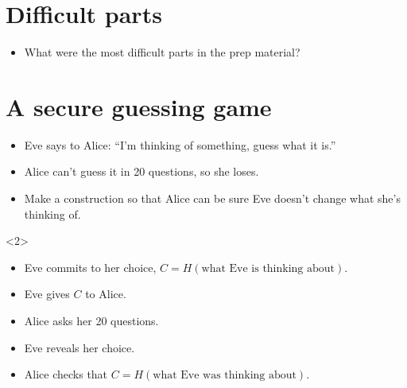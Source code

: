 \mode*

\section{Difficult parts}

\begin{frame}
  \begin{question}
    \begin{itemize}
      \item What were the most difficult parts in the prep material?
    \end{itemize}
  \end{question}
\end{frame}

\section{A secure guessing game}

\begin{frame}
  \begin{exercise}
    \begin{itemize}
      \item Eve says to Alice: \enquote{I'm thinking of something, guess what 
        it is.}
      \item Alice can't guess it in 20 questions, so she loses.
      \item Make a construction so that Alice can be sure Eve doesn't change 
        what she's thinking of.
    \end{itemize}
  \end{exercise}

  \begin{onlyenv}<2>
    \begin{solution}
      \begin{itemize}
        \item Eve commits to her choice,
          \(C = H(\text{what Eve is thinking about})\).
        \item Eve gives \(C\) to Alice.
        \item Alice asks her 20 questions.
        \item Eve reveals her choice.
        \item Alice checks that \(C = H(\text{what Eve was thinking about})\).
      \end{itemize}
    \end{solution}
  \end{onlyenv}
\end{frame}

